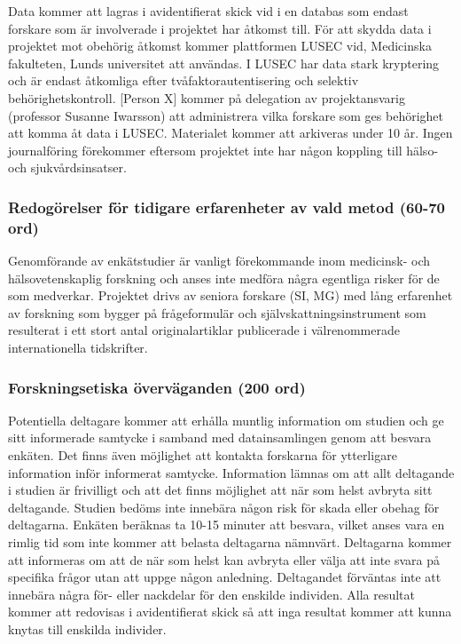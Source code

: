 \documentclass[]{tufte-handout}
\begin{document}
Data kommer att lagras i avidentifierat skick vid i en databas som
endast forskare som är involverade i projektet har åtkomst till. För att
skydda data i projektet mot obehörig åtkomst kommer plattformen LUSEC
vid, Medicinska fakulteten, Lunds universitet att användas. I LUSEC har
data stark kryptering och är endast åtkomliga efter
tvåfaktorautentisering och selektiv behörighetskontroll. {[}Person X{]}
kommer på delegation av projektansvarig (professor Susanne Iwarsson) att
administrera vilka forskare som ges behörighet att komma åt data i
LUSEC. Materialet kommer att arkiveras under 10 år. Ingen journalföring
förekommer eftersom projektet inte har någon koppling till hälso- och
sjukvårdsinsatser.

\hypertarget{redoguxf6relser-fuxf6r-tidigare-erfarenheter-av-vald-metod-60-70-ord}{%
\subsubsection{Redogörelser för tidigare erfarenheter av vald metod
(60-70
ord)}\label{redoguxf6relser-fuxf6r-tidigare-erfarenheter-av-vald-metod-60-70-ord}}

Genomförande av enkätstudier är vanligt förekommande inom medicinsk- och
hälsovetenskaplig forskning och anses inte medföra några egentliga
risker för de som medverkar. Projektet drivs av seniora forskare (SI,
MG) med lång erfarenhet av forskning som bygger på frågeformulär och
självskattningsinstrument som resulterat i ett stort antal
originalartiklar publicerade i välrenommerade internationella
tidskrifter.

\hypertarget{forskningsetiska-uxf6vervuxe4ganden-200-ord}{%
\subsubsection{Forskningsetiska överväganden (200
ord)}\label{forskningsetiska-uxf6vervuxe4ganden-200-ord}}

Potentiella deltagare kommer att erhålla muntlig information om studien
och ge sitt informerade samtycke i samband med datainsamlingen genom att
besvara enkäten. Det finns även möjlighet att kontakta forskarna för
ytterligare information inför informerat samtycke. Information lämnas om
att allt deltagande i studien är frivilligt och att det finns möjlighet
att när som helst avbryta sitt deltagande. Studien bedöms inte innebära
någon risk för skada eller obehag för deltagarna. Enkäten beräknas ta
10-15 minuter att besvara, vilket anses vara en rimlig tid som inte
kommer att belasta deltagarna nämnvärt. Deltagarna kommer att informeras
om att de när som helst kan avbryta eller välja att inte svara på
specifika frågor utan att uppge någon anledning. Deltagandet förväntas
inte att innebära några för- eller nackdelar för den enskilde individen.
Alla resultat kommer att redovisas i avidentifierat skick så att inga
resultat kommer att kunna knytas till enskilda individer.
\end{document}
